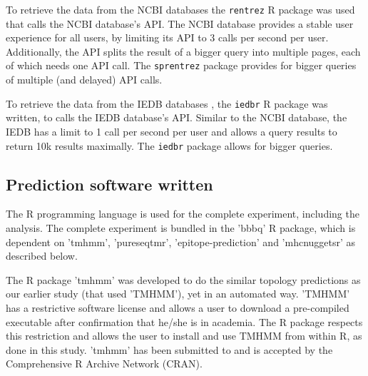 To retrieve the data from the NCBI databases the
\verb;rentrez; R package \cite{rentrez} was used
that calls the NCBI database's API. 
The NCBI database provides a stable user experience for all users, 
by limiting its API to 3 calls per second per user.
Additionally, the API splits the result of a bigger
query into multiple pages, each of which needs one API call.
The \verb;sprentrez; package \cite{sprentrez} provides for 
bigger queries of multiple (and delayed) API calls.


To retrieve the data from the IEDB  databases \cite{vita2019immune}, 
the \verb;iedbr; R package \cite{iedbr} was written,
to calls the IEDB database's API. 
Similar to the NCBI database,
the IEDB has a limit to 1 call per second per user
and allows a query results to return 10k results maximally.
The \verb;iedbr; package \cite{iedbr} allows for bigger queries.

\clearpage

\subsection{Prediction software written}

The R programming language is used for the complete 
experiment, including the analysis.
The complete experiment is bundled in the 'bbbq' R package,
which is dependent on 'tmhmm', 'pureseqtmr', 
'epitope-prediction' and 'mhcnuggetsr'
as described below.


The R package 'tmhmm' was developed to do the similar topology
predictions as our earlier study (that used 'TMHMM'), yet in an automated way.
'TMHMM' has a restrictive software license \cite{krogh2001predicting} 
and allows a user
to download a pre-compiled executable after confirmation that he/she
is in academia. The R package respects this restriction
and allows the user to install and use TMHMM from within R,
as done in this study.
'tmhmm' has been submitted to and is accepted 
by the Comprehensive R Archive Network (CRAN).

